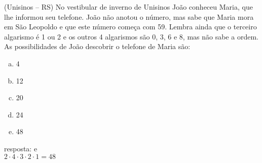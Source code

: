 \begin{ex}
(Unisinos – RS) No vestibular de inverno de Unisinos João conheceu Maria, que lhe informou seu telefone. João não anotou o número, mas sabe que Maria mora em     São Leopoldo e que este número começa com 59. Lembra ainda que o terceiro algarismo é 1 ou 2 e os outros 4 algarismos são 0, 3, 6 e 8, mas não sabe a ordem. As possibilidades de João descobrir o telefone de Maria são:
   \begin{enumerate}[(a)]
   \item 4
   \item 12
   \item 20
   \item 24
   \item 48
   \end{enumerate}
     \begin{sol}
       resposta: e \\
       $2\cdot4\cdot3\cdot2\cdot1=48$
     \end{sol}
\end{ex}
